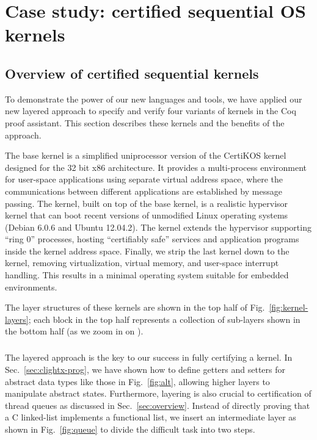 \chapter{Case study: certified sequential OS kernels}
\label{chap:kernel}

\section{Overview of certified sequential kernels}
To demonstrate the power of our new languages and tools,
we have applied our new layered approach to specify and
verify four variants of \mCTOS{} kernels in the Coq proof assistant.
This section describes these kernels and the benefits of the approach.

The \mCTOSbase{} base kernel is a simplified uniprocessor version of
the CertiKOS kernel~\cite{gu11} designed for the 32 bit x86
architecture.  It provides a multi-process environment for user-space
applications using separate virtual address space, where the
communications between different applications are established by
message passing.  The \mCTOShyper{} kernel, built on top of the base
kernel, is a realistic hypervisor kernel that can boot recent versions
of unmodified Linux operating systems (Debian 6.0.6 and Ubuntu
12.04.2).  The \mCTOSringz{} kernel extends the hypervisor supporting
``ring 0'' processes, hosting ``certifiably safe'' services and
application programs inside the kernel address space.  Finally, we
strip the last kernel down to the \mCTOSembed{} kernel, removing
virtualization, virtual memory, and user-space interrupt handling.
This results in a minimal operating system suitable for embedded
environments.

The layer structures of these kernels are shown in the top half of
Fig.\ \ref{fig:kernel-layers};
each block in the top half represents a collection
of sub-layers shown in the bottom half (as we zoom in on \mCTOShyper).

\paragraph{\mCTOSbase{}}
The layered approach is the key to our success in fully certifying a kernel.
In Sec.~\ref{sec:clightx-prog}, we have shown how to define getters and
setters for abstract data types like those in Fig.\ \ref{fig:alt},
allowing higher layers to manipulate abstract states.
Furthermore, layering is also crucial to certification of thread queues
as discussed in Sec.~\ref{sec:overview}.
Instead of directly proving that a C linked-list implements a functional list,
we insert an intermediate layer as shown in Fig.~\ref{fig:queue}
to divide the difficult task into two steps.

